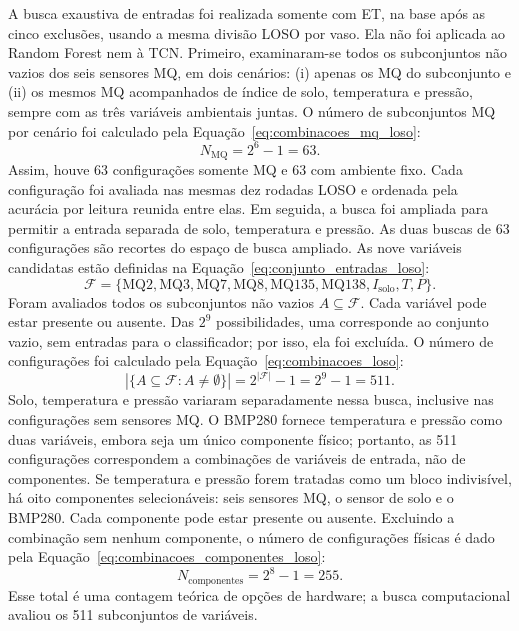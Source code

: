 A busca exaustiva de entradas foi realizada somente com ET, na base após
as cinco exclusões, usando a mesma divisão LOSO por vaso. Ela não foi
aplicada ao Random Forest nem à TCN. Primeiro, examinaram-se todos os
subconjuntos não vazios dos seis sensores MQ, em dois cenários: (i) apenas
os MQ do subconjunto e (ii) os mesmos MQ acompanhados de índice de solo,
temperatura e pressão, sempre com as três variáveis ambientais juntas.
O número de subconjuntos MQ por cenário foi calculado pela
Equação~\eqref{eq:combinacoes_mq_loso}:
\begin{equation}
    N_{\mathrm{MQ}}=2^{6}-1=63.
    \label{eq:combinacoes_mq_loso}
\end{equation}
Assim, houve 63 configurações somente MQ e 63 com ambiente fixo. Cada
configuração foi avaliada nas mesmas dez rodadas LOSO e ordenada pela
acurácia por leitura reunida entre elas. Em seguida, a busca foi ampliada
para permitir a entrada separada de solo, temperatura e pressão. As duas
buscas de 63 configurações são recortes do espaço de busca ampliado.
As nove variáveis candidatas estão definidas na
Equação~\eqref{eq:conjunto_entradas_loso}:
\begin{equation}
    \mathcal{F}=\{\mathrm{MQ2},\mathrm{MQ3},\mathrm{MQ7},\mathrm{MQ8},
    \mathrm{MQ135},\mathrm{MQ138},I_{\mathrm{solo}},T,P\}.
    \label{eq:conjunto_entradas_loso}
\end{equation}
Foram avaliados todos os subconjuntos não vazios $A\subseteq\mathcal{F}$.
Cada variável pode estar presente ou ausente. Das $2^9$ possibilidades,
uma corresponde ao conjunto vazio, sem entradas para o classificador;
por isso, ela foi excluída.
O número de configurações foi calculado pela
Equação~\eqref{eq:combinacoes_loso}:
\begin{equation}
    \left|\{A\subseteq\mathcal{F}:A\neq\emptyset\}\right|
    =2^{|\mathcal{F}|}-1=2^9-1=511.
    \label{eq:combinacoes_loso}
\end{equation}
Solo, temperatura e pressão variaram separadamente nessa busca,
inclusive nas configurações sem sensores MQ. O BMP280 fornece
temperatura e pressão como duas variáveis, embora seja um único componente
físico; portanto, as 511 configurações correspondem a combinações de
variáveis de entrada, não de componentes. Se temperatura e pressão forem
tratadas como um bloco indivisível, há oito componentes selecionáveis:
seis sensores MQ, o sensor de solo e o BMP280. Cada componente pode estar
presente ou ausente. Excluindo a combinação sem nenhum componente, o
número de configurações físicas é dado pela
Equação~\eqref{eq:combinacoes_componentes_loso}:
\begin{equation}
    N_{\mathrm{componentes}}=2^8-1=255.
    \label{eq:combinacoes_componentes_loso}
\end{equation}
Esse total é uma contagem teórica de opções de hardware; a busca
computacional avaliou os 511 subconjuntos de variáveis.

